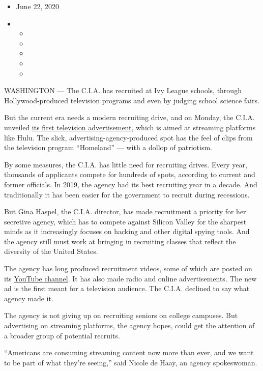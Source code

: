 \begin{itemize}
\item
  June 22, 2020
\item
  \begin{itemize}
  \item
  \item
  \item
  \item
  \item
  \end{itemize}
\end{itemize}

WASHINGTON --- The C.I.A. has recruited at Ivy League schools, through
Hollywood-produced television programs and even by judging school
science fairs.

But the current era needs a modern recruiting drive, and on Monday, the
C.I.A. unveiled
\href{https://www.youtube.com/watch?v=KvG8c8aVtl8\&feature=youtu.be}{its
first television advertisement}, which is aimed at streaming platforms
like Hulu. The slick, advertising-agency-produced spot has the feel of
clips from the television program ``Homeland'' --- with a dollop of
patriotism.

By some measures, the C.I.A. has little need for recruiting drives.
Every year, thousands of applicants compete for hundreds of spots,
according to current and former officials. In 2019, the agency had its
best recruiting year in a decade. And traditionally it has been easier
for the government to recruit during recessions.

But Gina Haspel, the C.I.A. director, has made recruitment a priority
for her secretive agency, which has to compete against Silicon Valley
for the sharpest minds as it increasingly focuses on hacking and other
digital spying tools. And the agency still must work at bringing in
recruiting classes that reflect the diversity of the United States.

The agency has long produced recruitment videos, some of which are
posted on its
\href{https://www.youtube.com/channel/UClFKF4TkuGWFkkeMYYQoOmg}{YouTube
channel}. It has also made radio and online advertisements. The new ad
is the first meant for a television audience. The C.I.A. declined to say
what agency made it.

The agency is not giving up on recruiting seniors on college campuses.
But advertising on streaming platforms, the agency hopes, could get the
attention of a broader group of potential recruits.

``Americans are consuming streaming content now more than ever, and we
want to be part of what they're seeing,'' said Nicole de Haay, an agency
spokeswoman.

